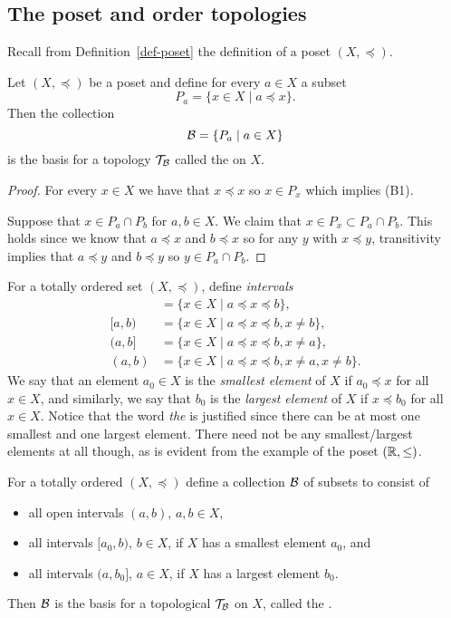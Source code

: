 \subsection{The poset and order topologies}
Recall from Definition~\ref{def-poset} the definition of a poset $(X,\preceq)$.
\begin{prop}
  \label{poset-top-def}
  Let $(X,\preceq)$ be a poset and define for every $a \in X$ a subset
  \[
    P_a = \{ x \in X \mid a \preceq x\}.
  \]
  Then the collection
  \[
    \mathcal{B} = \{ P_a \mid a \in X \}
  \]
  is the basis for a topology $\mathcal{T}_{\mathcal{B}}$ called the  on $X$.
\end{prop}
\begin{proof}
  For every $x \in X$ we have that $x \preceq x$ so $x \in P_x$ which implies (B1).
  
  Suppose that $x \in P_a \cap P_b$ for $a,b \in X$. We claim that $x \in P_x \subset P_a \cap P_b$. This holds since we know that $a \preceq x$ and $b \preceq x$ so for any $y$ with $x \preceq y$, transitivity implies that $a \preceq y$ and $b \preceq y$ so $y \in P_a \cap P_b$.
\end{proof}
For a totally ordered set $(X,\preceq)$, define \emph{intervals}
\begin{align*}
  [a,b] &= \{ x \in X \mid a \preceq x \preceq b \},\\
  [a,b) &= \{ x \in X \mid a \preceq x \preceq b, x \not= b \},\\
  (a,b] &= \{ x \in X \mid a \preceq x \preceq b, x \not= a \},\\
  (a,b) &= \{ x \in X \mid a \preceq x \preceq b, x\not= a, x \not= b \}.
\end{align*}
We say that an element $a_0 \in X$ is the \emph{smallest element} of $X$ if $a_0 \preceq x$ for all $x \in X$, and similarly, we say that $b_0$ is the \emph{largest element} of $X$ if $x \preceq b_0$ for all $x \in X$. Notice that the word \emph{the} is justified since there can be at most one smallest and one largest element. There need not be any smallest/largest elements at all though, as is evident from the example of the poset $(\mathbb{R},\leq)$.
\begin{prop}
  For a totally ordered $(X,\preceq)$ define a collection $\mathcal{B}$ of subsets to consist of
  \begin{itemize}
    \item all open intervals $(a,b)$, $a,b \in X$,
    \item all intervals $[a_0,b)$, $b \in X$, if $X$ has a smallest element $a_0$, and
    \item all intervals $(a,b_0]$, $a \in X$, if $X$ has a largest element $b_0$.
  \end{itemize}
  Then $\mathcal{B}$ is the basis for a topological $\mathcal{T}_{\mathcal{B}}$ on $X$, called the .
\end{prop}
